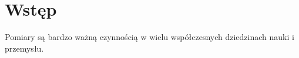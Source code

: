 \section{Wstęp}
Pomiary są bardzo ważną czynnością w wielu współczesnych dziedzinach nauki i przemysłu.